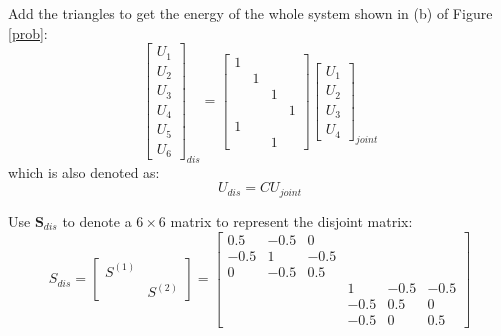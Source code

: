 \documentclass[a4paper,titlepage]{article}
\begin{document}
		Add the triangles to get the energy of the whole system shown in (b) of Figure \ref{prob}:
		$$
			\begin{bmatrix}
				U_1 \\
				U_2 \\
				U_3 \\
				U_4 \\
				U_5 \\
				U_6				
			\end{bmatrix}_{dis} = 
			\begin{bmatrix}
				1&&&\\
				&1&&\\
				&&1&\\
				&&&1\\
				1&&&\\
				&&1&
			\end{bmatrix}
			\begin{bmatrix}
				U_1 \\
				U_2 \\
				U_3 \\
				U_4
			\end{bmatrix}_{joint}
		$$
		which is also denoted as:
		$$
			U_{dis} = CU_{joint}
		$$
		
		Use $\textbf{S}_{dis}$ to denote a $6\times 6$ matrix to represent the disjoint matrix:
		$$
			S_{dis} = 
			\begin{bmatrix}
				S^{(1)} & \\
				 & S^{(2)}				
			\end{bmatrix} = 
			\begin{bmatrix}
				0.5 & -0.5 & 0 & & & \\
				-0.5 & 1 & -0.5 & & & \\
				0 & -0.5 & 0.5 & & & \\
				& & & 1 & -0.5 & -0.5 \\
				& & & -0.5 & 0.5 & 0 \\
				& & & -0.5 & 0 & 0.5
			\end{bmatrix}
		$$
		
\end{document}
